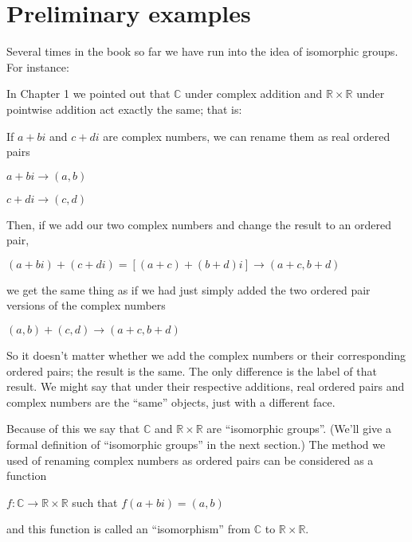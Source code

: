 
\section{Preliminary examples}\label{isomorph_defn_ex}

Several times in the book so far we have run into the idea of isomorphic groups.  For instance:

\begin{example}\label{example:isomorph:chap1_ex}
In Chapter 1 we pointed out that ${\mathbb C}$ under complex addition and ${\mathbb R} \times {\mathbb R}$ under pointwise addition act exactly the same; that is: 


\noindent
If $a+bi$ and $c+di$ are complex numbers, we can rename them as real ordered pairs

\begin{center}
$a+bi \longrightarrow (a,b)$

$c+di \longrightarrow (c,d)$
\end{center}

\noindent
Then, if we add our two complex numbers and change the result to an ordered pair, 

\begin{center}
$(a+bi) + (c+di) = [(a+c) + (b+d)i] \longrightarrow (a+c, b+d)$
\end{center}

\noindent
we get the same thing as if we had just simply added the two ordered pair versions of the complex numbers

\begin{center}
$(a, b) + (c, d) \longrightarrow (a+c, b+d)$
\end{center}

\noindent
So it doesn't matter whether we add the complex numbers or their corresponding ordered pairs; the result is the same.  The only difference is the label of that result.  We might say that under their respective additions, real ordered pairs and complex numbers are the ``same'' objects, just with  a different face.

Because of this we say that ${\mathbb C}$ and ${\mathbb R} \times {\mathbb R}$ are ``isomorphic groups''. (We'll give a formal definition of ``isomorphic groups'' in the next section.) The method we used of renaming complex numbers as ordered pairs  can be considered as  a function 

\begin{center}
$f : {\mathbb C} \longrightarrow {\mathbb R} \times {\mathbb R}$ such that $f(a + bi) = (a,b)$
\end{center}

\noindent
and this function is called an ``isomorphism'' from ${\mathbb C}$ to  ${\mathbb R} \times {\mathbb R}$.
\end{example}


